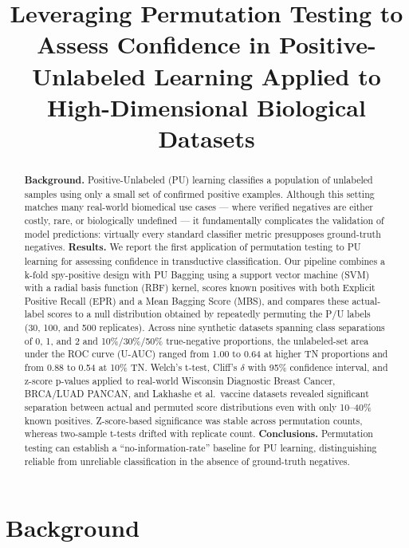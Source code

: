 \documentclass[11pt]{article}
\title{Leveraging Permutation Testing to Assess Confidence in Positive-Unlabeled Learning Applied to High-Dimensional Biological Datasets}
\author{}
\date{}
\begin{document}
\maketitle

\begin{abstract}
\textbf{Background.} Positive-Unlabeled (PU) learning classifies a population of unlabeled samples using only a small set of confirmed positive examples. Although this setting matches many real-world biomedical use cases --- where verified negatives are either costly, rare, or biologically undefined --- it fundamentally complicates the validation of model predictions: virtually every standard classifier metric presupposes ground-truth negatives. \textbf{Results.} We report the first application of permutation testing to PU learning for assessing confidence in transductive classification. Our pipeline combines a k-fold spy-positive design with PU Bagging using a support vector machine (SVM) with a radial basis function (RBF) kernel, scores known positives with both Explicit Positive Recall (EPR) and a Mean Bagging Score (MBS), and compares these actual-label scores to a null distribution obtained by repeatedly permuting the P/U labels (30, 100, and 500 replicates). Across nine synthetic datasets spanning class separations of 0, 1, and 2 and 10\%/30\%/50\% true-negative proportions, the unlabeled-set area under the ROC curve (U-AUC) ranged from 1.00 to 0.64 at higher TN proportions and from 0.88 to 0.54 at 10\% TN. Welch's t-test, Cliff's $\delta$ with 95\% confidence interval, and z-score p-values applied to real-world Wisconsin Diagnostic Breast Cancer, BRCA/LUAD PANCAN, and Lakhashe et al.\ vaccine datasets revealed significant separation between actual and permuted score distributions even with only 10--40\% known positives. Z-score-based significance was stable across permutation counts, whereas two-sample t-tests drifted with replicate count. \textbf{Conclusions.} Permutation testing can establish a ``no-information-rate'' baseline for PU learning, distinguishing reliable from unreliable classification in the absence of ground-truth negatives.
\end{abstract}

\section{Background}
\end{document}
